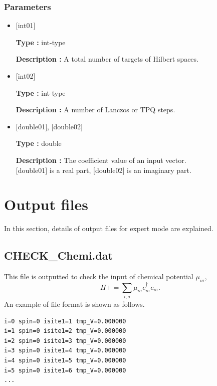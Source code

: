 \subsubsection{Parameters}
 \begin{itemize}

  \item  $[$int01$]$

 {\bf Type :} int-type

{\bf Description :}  A total number of targets of Hilbert spaces.

  \item  $[$int02$]$

 {\bf Type :} int-type

{\bf Description :}  { A number of Lanczos or TPQ steps.}

 \item  $[$double01$]$, $[$double02$]$

 {\bf Type :} double 

{\bf Description :} The coefficient value of an input vector.\\
$[$double01$]$ is a real part, $[$double02$]$ is an imaginary part.\\

\end{itemize}

\newpage
\section{Output files}
\label{Sec:outputfile}
In this section, details of output files for expert mode are explained.
\subsection{CHECK\_Chemi.dat}
\label{Subsec:checkchemi}
This file is outputted to check the input of chemical potential $\mu_{i\sigma}$,
\begin{equation}
H+=\sum_{i,\sigma} \mu_{i\sigma} c_{i\sigma}^{\dagger}c_{i\sigma}.
\end{equation}
An example of file format is shown as follows.

\begin{minipage}{12.5cm}
\begin{screen}
\begin{verbatim}
i=0 spin=0 isite1=1 tmp_V=0.000000 
i=1 spin=0 isite1=2 tmp_V=0.000000 
i=2 spin=0 isite1=3 tmp_V=0.000000 
i=3 spin=0 isite1=4 tmp_V=0.000000 
i=4 spin=0 isite1=5 tmp_V=0.000000 
i=5 spin=0 isite1=6 tmp_V=0.000000 
...
\end{verbatim}
\end{screen}
\end{minipage}

